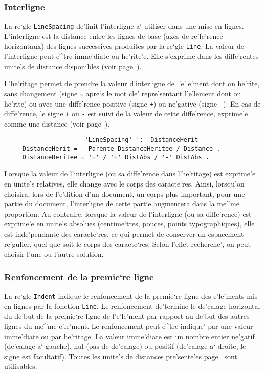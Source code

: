 {\subsubsection{Interligne}
\label{interligne}

La re`gle {\tt LineSpacing} de'finit l'interligne a` utiliser dans une mise en
lignes. L'interligne est la distance
entre les lignes de base (axes de re'fe'rence horizontaux) des lignes
successives produites par la re`gle {\tt Line}. La valeur de l'interligne
peut e^tre imme'diate ou he'rite'e. Elle s'exprime dans les diffe'rentes
unite's de distance disponibles (voir page~\pageref{unites}).

L'he'ritage permet de prendre la valeur d'interligne de l'e'le'ment dont on
he'rite, sans changement (signe {\tt =} apre`s le mot cle' repre'sentant
l'e'lement dont on he'rite) ou avec une diffe'rence positive (signe {\tt +})
ou ne'gative (signe {\tt -}). En cas de diffe'rence, le signe {\tt +} ou
{\tt -} est suivi de la valeur de cette diffe'rence, exprime'e comme une
distance (voir page~\pageref{distance}).

\begin{verbatim}
                      'LineSpacing' ':' DistanceHerit
     DistanceHerit =   Parente DistanceHeritee / Distance .
     DistanceHeritee = '=' / '+' DistAbs / '-' DistAbs .
\end{verbatim}

Lorsque la valeur de l'interligne (ou sa diffe'rence dans l'he'ritage) est
exprime'e en unite's relatives, elle change avec le corps des caracte`res.
Ainsi, lorsqu'on choisira, lors de l'e'dition d'un document, un corps plus
important, pour une partie du document,
l'interligne de cette partie augmentera dans la me^me proportion.
Au contraire, lorsque la valeur de l'interligne (ou sa diffe'rence) est
exprime'e en unite's
absolues (centime`tres, pouces, points typographiques), elle est inde'pendante
des caracte`res, ce qui permet de conserver un espacement re'gulier, quel que
soit le corps des caracte`res. Selon l'effet recherche', on peut choisir
l'une ou l'autre solution.

\subsubsection{Renfoncement de la premie`re ligne}

La re`gle {\tt Indent} indique le renfoncement de la premie`re ligne des
e'le'ments mis en lignes par la fonction {\tt Line}. Le renfoncement
de'termine le de'calage horizontal du de'but de la premie`re ligne de l'e'le'ment
par rapport au de'but des autres lignes du me^me e'le'ment. Le renfoncement peut e^tre
indique' par une valeur imme'diate ou par he'ritage. La valeur imme'diate
est un nombre entier ne'gatif (de'calage a` gauche), nul (pas de de'calage) ou
positif (de'calage a` droite, le signe est facultatif). Toutes les unite's
de distances pre'sente'es page~\pageref{unites} sont utilisables.

}
